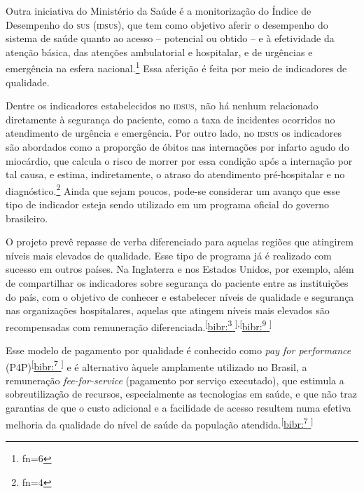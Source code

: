 \documentclass{article}
\makeatletter
\newcommand{\fn}{\afterassignment\fn@aux\count0=}
\newcommand{\fn@aux}{\csname fn\the\count0\endcsname}
\makeatother
\begin{document}
Outra iniciativa do Ministério da Saúde é a monitorização do Índice de
Desempenho do \textsc{sus}
(\textsc{idsus}), que tem como objetivo aferir o desempenho do sistema de saúde quanto ao
acesso –
potencial ou obtido – e à efetividade da atenção básica, das atenções
ambulatorial e
hospitalar, e de urgências e emergência na esfera nacional.\footnote{\fn6}
Essa aferição é feita por meio de indicadores de qualidade.

Dentre os indicadores estabelecidos no \textsc{idsus}, não há nenhum relacionado
diretamente à
segurança do paciente, como a taxa de incidentes ocorridos no atendimento de
urgência e
emergência. Por outro lado, no \textsc{idsus} os indicadores são abordados como a
proporção de óbitos
nas internações por infarto agudo do miocárdio, que calcula o risco de morrer
por essa
condição após a internação por tal causa, e estima, indiretamente, o atraso do
atendimento
pré-hospitalar e no diagnóstico.\footnote{\fn4}
Ainda que sejam poucos, pode-se considerar um avanço que esse tipo de indicador
esteja sendo utilizado em um programa oficial do governo brasileiro.

O projeto prevê repasse de verba diferenciado para aquelas regiões que atingirem
níveis
mais elevados de qualidade. Esse tipo de programa já é realizado com sucesso em
outros
países. Na Inglaterra e nos Estados Unidos, por exemplo, além de compartilhar os
indicadores
sobre segurança do paciente entre as instituições do país, com o objetivo de
conhecer e
estabelecer níveis de qualidade e segurança nas organizações hospitalares,
aquelas que
atingem níveis mais elevados são recompensadas com remuneração diferenciada.\textsuperscript{[}\hyperlink{\textsuperscript{3}
}{bibr:\textsuperscript{3}
}\textsuperscript{]}\textsuperscript{,}\textsuperscript{[}\hyperlink{\textsuperscript{9}
}{bibr:\textsuperscript{9}
}\textsuperscript{]}

Esse modelo de pagamento por qualidade é conhecido como \textit{pay for
performance}
(P4P)\textsuperscript{[}\hyperlink{\textsuperscript{7}
}{bibr:\textsuperscript{7}
}\textsuperscript{]}
e é alternativo àquele amplamente utilizado no Brasil, a remuneração
\textit{fee-for-service}
(pagamento por serviço executado), que estimula a
sobreutilização de recursos, especialmente as tecnologias em saúde, e que não
traz garantias
de que o custo adicional e a facilidade de acesso resultem numa efetiva melhoria
da
qualidade do nível de saúde da população atendida.\textsuperscript{[}\hyperlink{\textsuperscript{7}
}{bibr:\textsuperscript{7}
}\textsuperscript{]}
\end{document}
